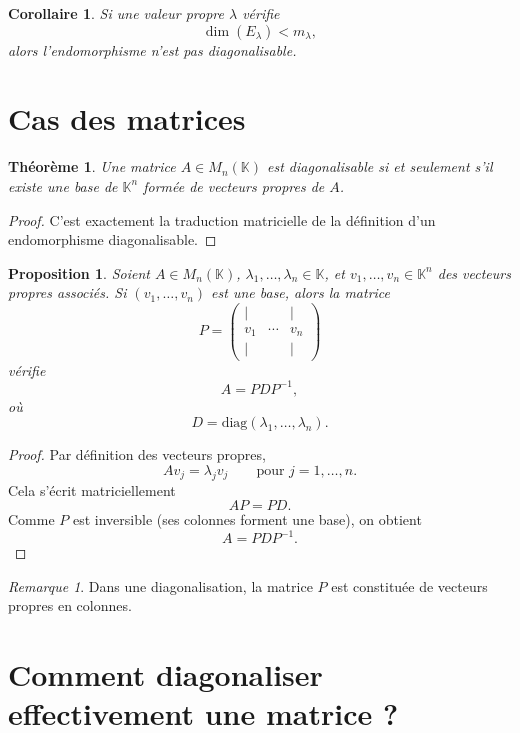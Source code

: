 \documentclass[11pt,a4paper]{article}
\newtheorem{theoreme}[definition]{Théorème}
\newtheorem{proposition}[definition]{Proposition}
\newtheorem{corollaire}[definition]{Corollaire}
\theoremstyle{remark}
\newtheorem{remarque}[definition]{Remarque}
\newcommand{\K}{\mathbb{K}}
\newcommand{\diag}{\mathrm{diag}}
\begin{document}
\begin{corollaire}
Si une valeur propre \(\lambda\) vérifie
\[
\dim(E_\lambda)<m_\lambda,
\]
alors l’endomorphisme n’est pas diagonalisable.
\end{corollaire}

\section{Cas des matrices}

\begin{theoreme}
Une matrice \(A\in M_n(\K)\) est diagonalisable si et seulement s’il existe une base de \(\K^n\) formée de vecteurs propres de \(A\).
\end{theoreme}

\begin{proof}
C’est exactement la traduction matricielle de la définition d’un endomorphisme diagonalisable.
\end{proof}

\begin{proposition}
Soient \(A\in M_n(\K)\), \(\lambda_1,\dots,\lambda_n\in\K\), et \(v_1,\dots,v_n\in\K^n\) des vecteurs propres associés. Si \((v_1,\dots,v_n)\) est une base, alors la matrice
\[
P=\begin{pmatrix}
| & & |\\
v_1 & \cdots & v_n\\
| & & |
\end{pmatrix}
\]
vérifie
\[
A=PDP^{-1},
\]
où
\[
D=\diag(\lambda_1,\dots,\lambda_n).
\]
\end{proposition}

\begin{proof}
Par définition des vecteurs propres,
\[
Av_j=\lambda_j v_j
\qquad \text{pour } j=1,\dots,n.
\]
Cela s’écrit matriciellement
\[
AP=PD.
\]
Comme \(P\) est inversible (ses colonnes forment une base), on obtient
\[
A=PDP^{-1}.
\]
\end{proof}

\begin{remarque}
Dans une diagonalisation, la matrice \(P\) est constituée de vecteurs propres en colonnes.
\end{remarque}

\section{Comment diagonaliser effectivement une matrice ?}
\end{document}
